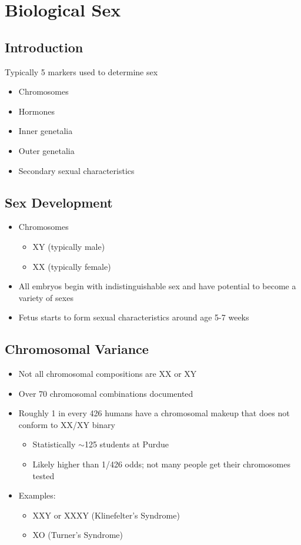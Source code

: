 \documentclass[a4paper]{article}
\begin{document}
\setcounter{section}{5}
\section{Biological Sex} %

\subsection{Introduction}
Typically 5 markers used to determine sex
\begin{itemize}
  \item Chromosomes
  \item Hormones
  \item Inner genetalia
  \item Outer genetalia
  \item Secondary sexual characteristics
\end{itemize}

\subsection{Sex Development}
\begin{itemize}
  \item Chromosomes \begin{itemize}
    \item XY (typically male)
    \item XX (typically female)
  \end{itemize}
  \item All embryos begin with indistinguishable sex and have potential to become a variety of sexes
  \item Fetus starts to form sexual characteristics around age 5-7 weeks
\end{itemize}

\subsection{Chromosomal Variance}
\begin{itemize}
  \item Not all chromosomal compositions are XX or XY
  \item Over 70 chromosomal combinations documented
  \item Roughly 1 in every 426 humans have a chromosomal makeup that does not conform to XX/XY binary \begin{itemize}
    \item Statistically $ \sim $125 students at Purdue
    \item Likely higher than 1/426 odds; not many people get their chromosomes tested
  \end{itemize}
  \item Examples: \begin{itemize}
    \item XXY or XXXY (Klinefelter's Syndrome)
    \item XO (Turner's Syndrome)
  \end{itemize}
\end{itemize}
\end{document}

